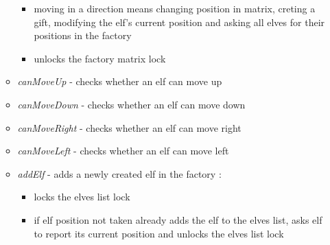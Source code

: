 \documentclass{article}
\begin{document}
\begin{itemize}
\begin{itemize}
\begin{itemize}
                        \item moving in a direction means changing position in matrix, creting a gift, modifying the elf's current position and asking all elves for their positions in the factory
                        \item unlocks the factory matrix lock
                    \end{itemize}
                \item \textit{canMoveUp} - checks whether an elf can move up
                \item \textit{canMoveDown} - checks whether an elf can move down
                \item \textit{canMoveRight} - checks whether an elf can move right
                \item \textit{canMoveLeft} - checks whether an elf can move left
                \item \textit{addElf} - adds a newly created elf in the factory :
                    \begin{itemize}
                        \item locks the elves list lock
                        \item if elf position not taken already adds the elf to the elves list, asks elf to report its current position and unlocks the elves list lock
                        

\end{itemize}
\end{itemize}
\end{itemize}
\end{document}
